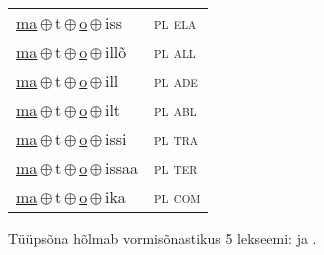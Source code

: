 \begin{minipage}{\textwidth}
\begin{sideways}
\begin{tabular}{l l}
\underline{ma}\,$\oplus$\,t\,$\oplus$\,\underline{o}\,$\oplus$\,iss & \textsc{ pl ela } \\
\underline{ma}\,$\oplus$\,t\,$\oplus$\,\underline{o}\,$\oplus$\,illõ & \textsc{ pl all } \\
\underline{ma}\,$\oplus$\,t\,$\oplus$\,\underline{o}\,$\oplus$\,ill & \textsc{ pl ade } \\
\underline{ma}\,$\oplus$\,t\,$\oplus$\,\underline{o}\,$\oplus$\,ilt & \textsc{ pl abl } \\
\underline{ma}\,$\oplus$\,t\,$\oplus$\,\underline{o}\,$\oplus$\,issi & \textsc{ pl tra } \\
\underline{ma}\,$\oplus$\,t\,$\oplus$\,\underline{o}\,$\oplus$\,issaa & \textsc{ pl ter } \\
\underline{ma}\,$\oplus$\,t\,$\oplus$\,\underline{o}\,$\oplus$\,ika & \textsc{ pl com } \\
\end{tabular}
\end{sideways}
\label{tab:tüüpsõnamall-mato}

\end{minipage}

 
\vspace{1em}
\noindent Tüüpsõna hõlmab vormisõnastikus 5 lekseemi:  ja .
